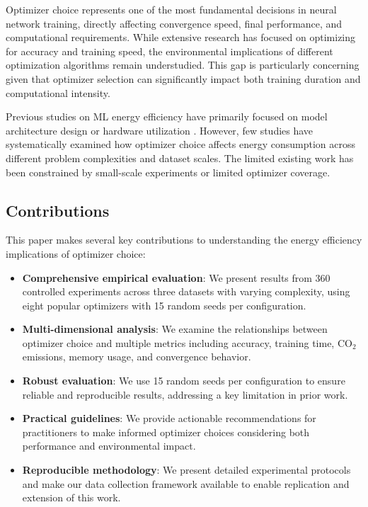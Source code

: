 \documentclass[conference]{IEEEtran}
\begin{document}
Optimizer choice represents one of the most fundamental decisions in neural network training, directly affecting convergence speed, final performance, and computational requirements. While extensive research has focused on optimizing for accuracy and training speed, the environmental implications of different optimization algorithms remain understudied. This gap is particularly concerning given that optimizer selection can significantly impact both training duration and computational intensity.

Previous studies on ML energy efficiency have primarily focused on model architecture design \cite{howard2017mobilenets} or hardware utilization \cite{patterson2021carbon}. However, few studies have systematically examined how optimizer choice affects energy consumption across different problem complexities and dataset scales. The limited existing work \cite{garcia2019estimation} has been constrained by small-scale experiments or limited optimizer coverage.

\subsection{Contributions}

This paper makes several key contributions to understanding the energy efficiency implications of optimizer choice:

\begin{itemize}
    \item \textbf{Comprehensive empirical evaluation}: We present results from 360 controlled experiments across three datasets with varying complexity, using eight popular optimizers with 15 random seeds per configuration.
    
    \item \textbf{Multi-dimensional analysis}: We examine the relationships between optimizer choice and multiple metrics including accuracy, training time, CO$_2$ emissions, memory usage, and convergence behavior.
    
    \item \textbf{Robust evaluation}: We use 15 random seeds per configuration to ensure reliable and reproducible results, addressing a key limitation in prior work.
    
    \item \textbf{Practical guidelines}: We provide actionable recommendations for practitioners to make informed optimizer choices considering both performance and environmental impact.
    
    \item \textbf{Reproducible methodology}: We present detailed experimental protocols and make our data collection framework available to enable replication and extension of this work.
\end{itemize}
\end{document}

